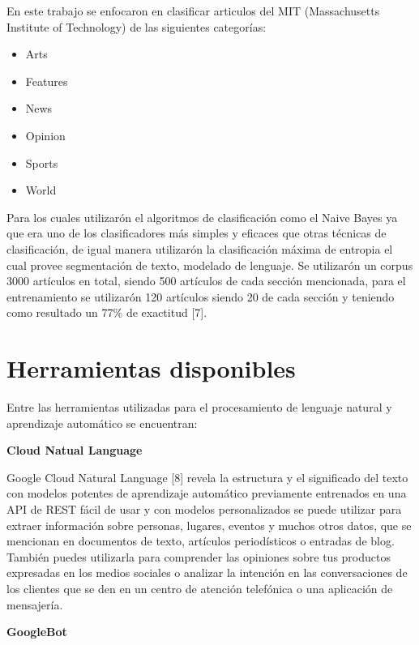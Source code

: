 En este trabajo se enfocaron en clasificar articulos del MIT (Massachusetts Institute of Technology) de las siguientes categorías:

	\begin{itemize}
		\item Arts
		\item Features
		\item News
		\item Opinion
		\item Sports
		\item World
	\end{itemize}
Para los cuales utilizarón el algoritmos de clasificación como el Naive Bayes ya que era uno de los clasificadores más simples y eficaces que otras técnicas de clasificación, de igual manera utilizarón la clasificación máxima de entropia el cual provee segmentación de texto, modelado de lenguaje.
Se utilizarón un corpus 3000 artículos en total, siendo 500 artículos de cada sección mencionada, para el entrenamiento se utilizarón 120 artículos siendo 20 de cada sección y teniendo como resultado un 77\% de exactitud [7].


\section{Herramientas disponibles}


Entre las herramientas utilizadas para el procesamiento de lenguaje natural y aprendizaje automático se encuentran:\\

\begin{large}
	 \textbf{Cloud Natual Language}\\
\end{large}

Google Cloud Natural Language [8] revela la estructura y el significado del texto con modelos potentes de aprendizaje automático previamente entrenados en una API de REST fácil de usar y con modelos personalizados se puede utilizar para extraer información sobre personas, lugares, eventos y muchos otros datos, que se mencionan en documentos de texto, artículos periodísticos o entradas de blog. También puedes utilizarla para comprender las opiniones sobre tus productos expresadas en los medios sociales o analizar la intención en las conversaciones de los clientes que se den en un centro de atención telefónica o una aplicación de mensajería.\\

\begin{large}
	 \textbf{GoogleBot}\\
\end{large}

